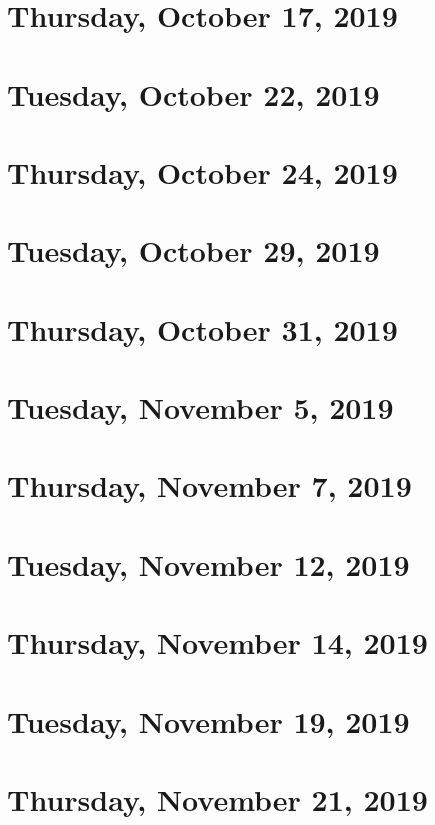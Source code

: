\documentclass{../mynotes}
\begin{document}
\section{Thursday, October 17, 2019}
    

\section{Tuesday, October 22, 2019}
    

\section{Thursday, October 24, 2019}
    

\section{Tuesday, October 29, 2019}
    
\section{Thursday, October 31, 2019}
    
    
\section{Tuesday, November 5, 2019}
    
\section{Thursday, November 7, 2019}
    

\section{Tuesday, November 12, 2019}
    
\section{Thursday, November 14, 2019}
    
    
\section{Tuesday, November 19, 2019}
    
\section{Thursday, November 21, 2019}
    
\end{document}

